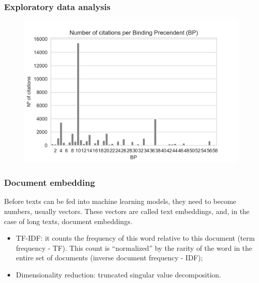 \documentclass{beamer}
\begin{document}
    \begin{frame}
        \frametitle{Exploratory data analysis}
        \begin{figure}
            \centering
            \includegraphics[width=0.8\linewidth]{bp_citations.png}
        \end{figure}
    \end{frame}



    \begin{frame}
        \frametitle{Document embedding}
        Before texts can be fed into machine learning models, they need to become numbers, usually vectors. These vectors are called text embeddings, and, in the case of long texts, document embeddings. \pause
        \begin{itemize}
            \item TF-IDF: it counts the frequency of this word relative to this document (term frequency - TF). This count is ``normalized'' by the rarity of the word in the entire set of documents (inverse document frequency - IDF); \pause
            \item Dimensionality reduction: truncated singular value decomposition.
        \end{itemize}
    \end{frame}
\end{document}
